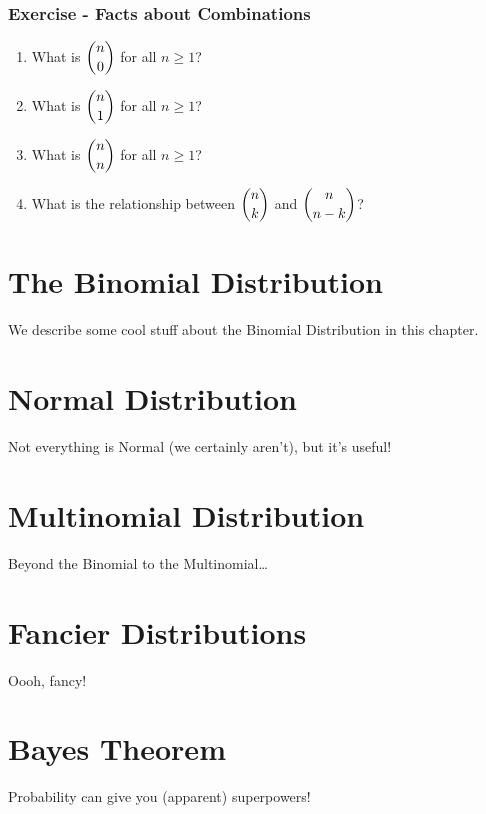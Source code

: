 \documentclass[]{book}
\providecommand{\tightlist}{%
  \setlength{\itemsep}{0pt}\setlength{\parskip}{0pt}}
\theoremstyle{definition}
\theoremstyle{definition}
\theoremstyle{definition}
\theoremstyle{remark}
\begin{document}
\subsection{Exercise - Facts about
Combinations}\label{exercise---facts-about-combinations}

\begin{enumerate}
\def\labelenumi{(\alph{enumi})}
\tightlist
\item
  What is \(\dbinom{n}{0}\) for all \(n \geq 1\)?
\item
  What is \(\dbinom{n}{1}\) for all \(n \geq 1\)?
\item
  What is \(\dbinom{n}{n}\) for all \(n \geq 1\)?
\item
  What is the relationship between \(\dbinom{n}{k}\) and
  \(\dbinom{n}{n-k}\)?
\end{enumerate}

\chapter{The Binomial Distribution}\label{the-binomial-distribution}

We describe some cool stuff about the Binomial Distribution in this
chapter.

\chapter{Normal Distribution}\label{normal}

Not everything is Normal (we certainly aren't), but it's useful!

\chapter{Multinomial Distribution}\label{multinom}

Beyond the Binomial to the Multinomial\ldots{}

\chapter{Fancier Distributions}\label{fancy}

Oooh, fancy!

\chapter{Bayes Theorem}\label{bayes}

Probability can give you (apparent) superpowers!
\end{document}
